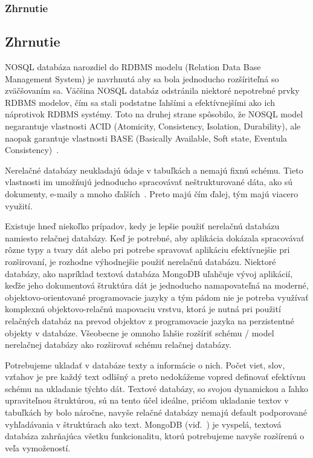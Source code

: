 %
%
{
	\subsubsection{Zhrnutie}
}
{
	\subsection{Zhrnutie}
}
NOSQL databáza narozdiel do RDBMS modelu (Relation Data Base Management System) je
navrhnutá aby sa bola jednoducho rozšíriteľná so zväčšovaním sa. Väčšina NOSQL databáz odstránila niektoré nepotrebné prvky RDBMS modelov, čím sa stali podstatne ľahšími a efektívnejšími ako ich náprotivok RDBMS systémy. Toto na druhej strane spôsobilo, že NOSQL model negarantuje vlastnosti ACID (Atomicity, Consistency, Isolation, Durability), ale naopak garantuje vlastnosti BASE (Basically Available, Soft state, Eventula Consistency)~\cite{NoSQLDBvsRealtionDB}.

Nerelačné databázy neukladajú údaje v tabuľkách a nemajú fixnú schému. Tieto vlastnosti im umožňujú jednoducho spracovávať neštrukturované dáta, ako sú dokumenty, e-maily a mnoho ďalších~\cite{MongoDBvsMySQL2015}. Preto majú čím ďalej, tým majú viacero využití.

Existuje hneď niekoľko prípadov, kedy je lepšie použiť nerelačnú databázu namiesto relačnej databázy. Keď je potrebné, aby aplikácia dokázala spracovávať rôzne typy a tvary dát alebo pri potrebe spravovať aplikáciu efektívnejšie pri rozširovaní, je rozhodne výhodnejšie použiť nerelačnú databázu. Niektoré databázy, ako napríklad textová databáza MongoDB uľahčuje vývoj aplikácií, keďže jeho dokumentová štruktúra dát je jednoducho namapovateľná na moderné, objektovo-orientované programovacie jazyky a tým pádom nie je potreba využívať komplexnú objektovo-relačnú mapovaciu vrstvu, ktorá je nutná pri použití relačných databáz na prevod objektov z programovacie jazyka na perzistentné objekty v databáze. Všeobecne je omnoho ľahšie rozšíriť schému / model nerelačnej databázy ako rozširovať schému relačnej databázy.

Potrebujeme ukladať v databáze texty a informácie o nich. Počet viet, slov, vzťahov je pre každý text odlišný a preto nedokážeme vopred definovať efektívnu schému na ukladanie týchto dát. Textové databázy, so svojou dynamickou a ľahko upraviteľnou štruktúrou, sú na tento účel ideálne, pričom ukladanie textov v tabuľkách by bolo náročne, navyše relačné databázy nemajú default podporované vyhľadávania v štruktúrach ako text. MongoDB (viď.~) je vyspelá, textová databáza zahrňajúca všetku funkcionalitu, ktorú potrebujeme navyše rozšírenú o veľa vymožeností.

